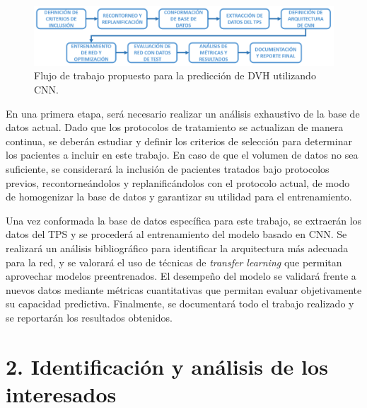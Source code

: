 \documentclass[
11pt, %
codirector, %
]{charter}
\begin{document}
\vspace{10px}

\begin{figure}[!htpb]
\centering 
\includegraphics[width=1\textwidth]{./Figuras/Fig2-DiagramaBloques.png}
\caption{Flujo de trabajo propuesto para la predicción de DVH utilizando CNN.}
\label{fig:DiagBloques}
\end{figure}

\vspace{15px}

En una primera etapa, será necesario realizar un análisis exhaustivo de la base de datos actual. Dado que los protocolos de tratamiento se actualizan de manera continua, se deberán estudiar y definir los criterios de selección para determinar los pacientes a incluir en este trabajo. En caso de que el volumen de datos no sea suficiente, se considerará la inclusión de pacientes tratados bajo protocolos previos, recontorneándolos y replanificándolos con el protocolo actual, de modo de homogenizar la base de datos y garantizar su utilidad para el entrenamiento.

Una vez conformada la base de datos específica para este trabajo, se extraerán los datos del TPS y se procederá al entrenamiento del modelo basado en CNN. Se realizará un análisis bibliográfico para identificar la arquitectura más adecuada para la red, y se valorará el uso de técnicas de \textit{transfer learning} que permitan aprovechar modelos preentrenados. El desempeño del modelo se validará frente a nuevos datos mediante métricas cuantitativas que permitan evaluar objetivamente su capacidad predictiva. Finalmente, se documentará todo el trabajo realizado y se reportarán los resultados obtenidos.

\section{2. Identificación y análisis de los interesados}
\label{sec:interesados}
\end{document}
